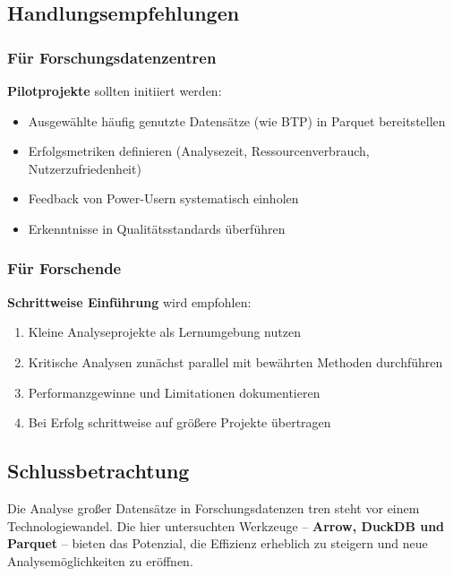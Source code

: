 \documentclass[
  ngerman,
  10pt,
  twocolumn]{article}
\providecommand{\tightlist}{%
  \setlength{\itemsep}{0pt}\setlength{\parskip}{0pt}}
\begin{document}
\subsection{Handlungsempfehlungen}\label{handlungsempfehlungen}

\subsubsection{Für
Forschungsdatenzentren}\label{fuxfcr-forschungsdatenzentren}

\textbf{Pilotprojekte} sollten initiiert werden:

\begin{itemize}
\tightlist
\item
  Ausgewählte häufig genutzte Datensätze (wie BTP) in Parquet
  bereitstellen
\item
  Erfolgsmetriken definieren (Analysezeit, Ressourcenverbrauch,
  Nutzerzufriedenheit)
\item
  Feedback von Power-Usern systematisch einholen
\item
  Erkenntnisse in Qualitätsstandards überführen
\end{itemize}

\subsubsection{Für Forschende}\label{fuxfcr-forschende}

\textbf{Schrittweise Einführung} wird empfohlen:

\begin{enumerate}
\def\labelenumi{\arabic{enumi}.}
\tightlist
\item
  Kleine Analyseprojekte als Lernumgebung nutzen
\item
  Kritische Analysen zunächst parallel mit bewährten Methoden
  durchführen
\item
  Performanzgewinne und Limitationen dokumentieren
\item
  Bei Erfolg schrittweise auf größere Projekte übertragen
\end{enumerate}

\subsection{Schlussbetrachtung}\label{schlussbetrachtung}

Die Analyse großer Datensätze in Forschungsdatenzen tren steht vor einem
Technologiewandel. Die hier untersuchten Werkzeuge -- \textbf{Arrow,
DuckDB und Parquet} -- bieten das Potenzial, die Effizienz erheblich zu
steigern und neue Analysemöglichkeiten zu eröffnen.
\end{document}
